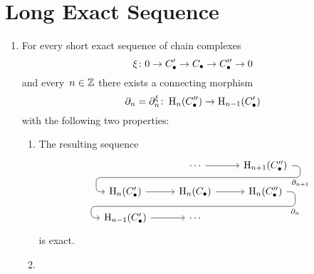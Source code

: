 \section{Long Exact Sequence}


\begin{theorem}
  \leavevmode
  \begin{enumerate}
    \item
      For every short exact sequence of chain complexes
      \[
        \xi
        \colon
        0
        \to
        C_\bullet'
        \to
        C_\bullet
        \to
        C_\bullet''
        \to
        0
      \]
      and every~$n \in \mathbb{Z}$ there exists a connecting morphism
      \[
        \partial_n
        =
        \partial_n^\xi
        \colon
        \operatorname{H}_n(C_\bullet'')
        \to
        \operatorname{H}_{n-1}(C_\bullet')
      \]
      with the following two properties:
      \begin{enumerate}
        \item
          The resulting sequence
          \[
            \begin{tikzcd}[row sep = small]
                {}
              & \dotsb
                \arrow{r}
                \arrow[d, phantom, ""{coordinate, name=Y}]
              & \Hl_{n+1}(\Ccc'')
                \arrow[ dll,
                        "\del_{n+1}",
                        rounded corners,
                        to path={ -- ([xshift=2ex]\tikztostart.east)
                                  |- (Y) \tikztonodes
                                  -| ([xshift=-2ex]\tikztotarget.west)
                                  -- (\tikztotarget)}
                      ]
              \\
                \Hl_n(\Ccc')
                \arrow{r}
              & \Hl_n(\Ccc)
                \arrow{r}
                \arrow[d, phantom, ""{coordinate, name=Z}]
              & \Hl_n(\Ccc'')
                \arrow[ dll,
                        "\del_n",
                        rounded corners,
                        to path={ -- ([xshift=2ex]\tikztostart.east)
                                  |- (Z) \tikztonodes
                                  -| ([xshift=-2ex]\tikztotarget.west)
                                  -- (\tikztotarget)}
                      ]
              \\
                \Hl_{n-1}(\Ccc')
                \arrow{r}
              & \dotsb
              & {}
            \end{tikzcd}
          \]
          is exact.
        \item

\end{enumerate}
\end{enumerate}
\end{theorem}
